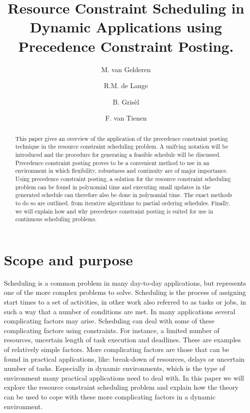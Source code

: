 \documentclass{article}
\title{Resource Constraint Scheduling in Dynamic Applications using Precedence Constraint Posting.}
\author{M. van Gelderen  \and
    R.M. de Lange \and
    B. Gris\`el \and
    F. van Tienen}
\date{}
\begin{document}
\maketitle
\thispagestyle{empty}

\begin{abstract}
This paper gives an overview of the application of the precedence constraint posting technique in the resource constraint scheduling problem.
A unifying notation will be introduced and the procedure for generating a feasible schedule will be discussed. Precedence constraint posting proves to be a convenient method to use in an environment in which flexibility, robustness and continuity are of major importance.
Using precedence constraint posting, a solution for the resource constraint scheduling problem can be found in polynomial time and executing small updates in the generated schedule can therefore also be done in polynomial time.
The exact methods to do so are outlined, from iterative algorithms to partial ordering schedules. Finally, we will explain how and why precedence constraint posting is suited for use in continuous scheduling problems. 
\end{abstract}

\newpage

\section{Scope and purpose}
Scheduling is a common problem in many day-to-day applications, but represents one of the more complex problems to solve.
Scheduling is the process of assigning start times to a set of activities, in other work also referred to as tasks or jobs, in such a way that a number of conditions are met. 
In many applications several complicating factors may arise.
Scheduling can deal with some of these complicating factors using constraints.
For instance, a limited number of resources, uncertain length of task execution and deadlines.
These are examples of relatively simple factors. 
More complicating factors are those that can be found in practical applications, like: break-down of resources, delays or uncertain number of tasks.
Especially in dynamic environments, which is the type of environment many practical applications need to deal with.
In this paper we will explore the resource constraint scheduling problem and explain how the theory can be used to cope with these more complicating factors in a dynamic environment.
\end{document}
